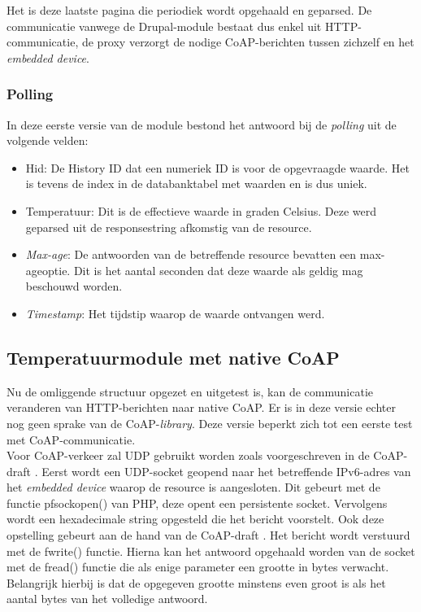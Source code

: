 Het is deze laatste pagina die periodiek wordt opgehaald en geparsed. De communicatie vanwege de Drupal-module bestaat dus enkel uit HTTP-communicatie, de proxy verzorgt de nodige CoAP-berichten tussen zichzelf en het \textit{embedded device}.

\subsubsection{Polling}
In deze eerste versie van de module bestond het antwoord bij de \textit{polling} uit de volgende velden:
\begin{itemize}
\item Hid: De History ID dat een numeriek ID is voor de opgevraagde waarde. Het is tevens de index in de databanktabel met waarden en is dus uniek.
\item Temperatuur: Dit is de effectieve waarde in graden Celsius. Deze werd geparsed uit de responsestring afkomstig van de resource.
\item \textit{Max-age}: De antwoorden van de betreffende resource bevatten een max-ageoptie. Dit is het aantal seconden dat deze waarde als geldig mag beschouwd worden.
\item \textit{Timestamp}: Het tijdstip waarop de waarde ontvangen werd.
\end{itemize}

\subsection{Temperatuurmodule met native CoAP}
Nu de omliggende structuur opgezet en uitgetest is, kan de communicatie veranderen van HTTP-berichten naar native CoAP. Er is in deze versie echter nog geen sprake van de CoAP-\textit{library}. Deze versie beperkt zich tot een eerste test met CoAP-communicatie.\\

Voor CoAP-verkeer zal UDP gebruikt worden zoals voorgeschreven in de CoAP-draft \cite{coapDraft}. Eerst wordt een UDP-socket geopend naar het betreffende IPv6-adres van het \textit{embedded device} waarop de resource is aangesloten. Dit gebeurt met de functie pfsockopen() van PHP, deze opent een persistente socket. Vervolgens wordt een hexadecimale string opgesteld die het bericht voorstelt. Ook deze opstelling gebeurt aan de hand van de CoAP-draft \cite{coapDraft}. Het bericht wordt verstuurd met de fwrite() functie. Hierna kan het antwoord opgehaald worden van de socket met de fread() functie die als enige parameter een grootte in bytes verwacht. Belangrijk hierbij is dat de opgegeven grootte minstens even groot is als het aantal bytes van het volledige antwoord.\\

